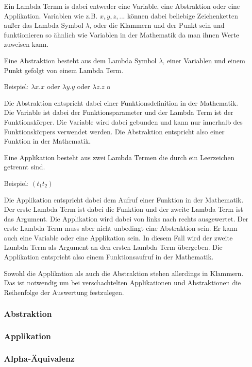 \documentclass{article}
\begin{document}
Ein Lambda Ternm is dabei entweder eine Variable, eine Abstraktion oder eine Applikation.
Variablen wie z.B. $x, y, z, ...$ können dabei beliebige Zeichenketten außer das Lambda Symbol $\lambda$, oder die Klammern und der Punkt sein und funktionieren so ähnlich wie Variablen in der Mathematik da man ihnen Werte zuweisen kann.


Eine Abstraktion besteht aus dem Lambda Symbol $\lambda$, einer Variablen und einem Punkt gefolgt von einem Lambda Term. 

Beispiel: $\lambda x.x$ oder $\lambda y.y$ oder $\lambda z.z$ o

Die Abstraktion entspricht dabei einer Funktionsdefinition in der Mathematik. Die Variable ist dabei der Funktionsparameter und der Lambda Term ist der Funktionskörper. Die Variable wird dabei gebunden und kann nur innerhalb des Funktionskörpers verwendet werden. Die Abstraktion entspricht also einer Funktion in der Mathematik.

Eine Applikation besteht aus zwei Lambda Termen die durch ein Leerzeichen getrennt sind. 

Beispiel: $(t_1 t_2)$ 

Die Applikation entspricht dabei dem Aufruf einer Funktion in der Mathematik. Der erste Lambda Term ist dabei die Funktion und der zweite Lambda Term ist das Argument. Die Applikation wird dabei von links nach rechts ausgewertet. Der erste Lambda Term muss aber nicht unbedingt eine Abstraktion sein. Er kann auch eine Variable oder eine Applikation sein. In diesem Fall wird der zweite Lambda Term als Argument an den ersten Lambda Term übergeben. Die Applikation entspricht also einem Funktionsaufruf in der Mathematik.

Sowohl die Applikation als auch die Abstraktion stehen allerdings in Klammern. Das ist notwendig um bei verschachtelten Applikationen und Abstraktionen die Reihenfolge der Auswertung festzulegen.

\subsubsection{Abstraktion}



\subsubsection{Applikation}

\subsubsection{Alpha-Äquivalenz}
\end{document}
